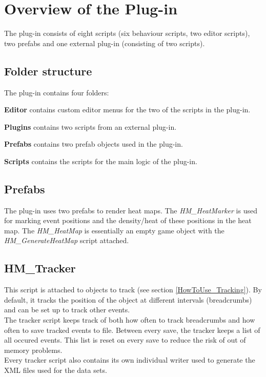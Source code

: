 \section{Overview of the Plug-in}
\label{CO}
The plug-in consists of eight scripts (six behaviour scripts, two editor scripts), two prefabs and one external plug-in (consisting of two scripts). 

\subsection{Folder structure}
\label{CO_FStructure}
The plug-in contains four folders:
\begin{my_itemize}
\item \textbf{Editor} contains custom editor menus for the two of the scripts in the plug-in.
\item \textbf{Plugins} contains two scripts from an external plug-in.
\item \textbf{Prefabs} contains two prefab objects used in the plug-in.
\item \textbf{Scripts} contains the scripts for the main logic of the plug-in.
\end{my_itemize}

\subsection{Prefabs}
\label{CO_Prefabs}
The plug-in uses two prefabs to render heat maps. The \textit{HM\_HeatMarker} is used for marking event positions and the density/heat of these positions in the heat map. The \textit{HM\_HeatMap} is essentially an empty game object with the \textit{HM\_GenerateHeatMap} script attached.

\subsection{HM\_Tracker}
\label{CO_Tracker}
This script is attached to objects to track (see section \ref{HowToUse_Tracking}). By default, it tracks the position of the object at different intervals (breadcrumbs) and can be set up to track other events. 
\\The tracker script keeps track of both how often to track breadcrumbs and how often to save tracked events to file. Between every save, the tracker keeps a list of all occured events. This list is reset on every save to reduce the risk of out of memory problems. 
\\Every tracker script also contains its own individual writer used to generate the XML files used for the data sets.

